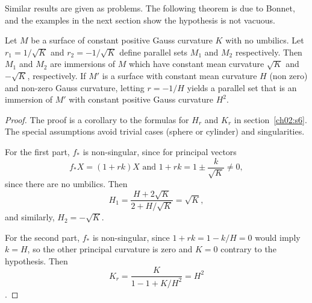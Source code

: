 \documentclass[../main]{subfiles}
\begin{document}
Similar results are given as problems. The following theorem is due to Bonnet, and the examples in the next section show the hypothesis is not vacuous. 



\begin{theorem} \label{thm:ch3.3.3}
Let $M$ be a surface of constant positive Gauss curvature $K$ with no umbilics. Let $r_1 = 1/\sqrt K$ and $r_2 = -1/\sqrt K$ define parallel sets $M_1$ and $M_2$ respectively. Then $M_1$ and $M_2$ are immersions of $M$ which have constant mean curvature $\sqrt K$ and $-\sqrt K$, respectively. If $M'$ is a surface with constant mean curvature $H$ (non zero) and non-zero Gauss curvature, letting $r = -1/H$ yields a parallel set that is an immersion of $M'$ with constant positive Gauss curvature $H^2$.
\end{theorem}

\begin{proof}
The proof is a corollary to the formulas for $H_r$ and $K_r$ in section~\ref{ch02:s6}. The special assumptions avoid trivial cases (sphere or cylinder) and singularities. 

For the first part, $f_\ast$ is non-singular, since for principal vectors \[f_\ast X = (1 + rk)X \text{ and } 1 + r k = 1 \pm \dfrac{k}{\sqrt{K}} \ne 0,\] since there are no umbilics. Then \[H_1 = \dfrac{H + 2 \sqrt K}{2 + H/\sqrt K} = \sqrt K,\] and similarly, $H_2 = -\sqrt K$.

For the second part, $f_\ast$ is non-singular, since $1 + r k = 1 - k/H = 0$ would imply $k = H$, so the other principal curvature is zero and $K = 0$ contrary to the hypothesis. Then \[K_r = \dfrac{K}{1 - 1 + K/H^2} = H^2\].
\end{proof}
\end{document}
